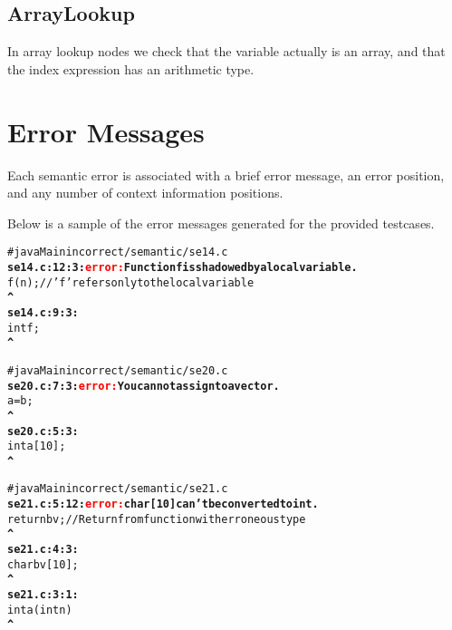 \documentclass[a4paper,11pt]{article}
\begin{document}
\subsection{ArrayLookup}
In array lookup nodes we check that the variable actually is an array, and that
the index expression has an arithmetic type.

\section{Error Messages}
Each semantic error is associated with a brief error message, an error position,
and any number of context information positions.

Below is a sample of the error messages generated for the provided testcases.

\begin{alltt}
# java Main incorrect/semantic/se14.c
\textbf{se14.c:12:3: \textcolor{red}{error:} Function f is shadowed by a local variable.}
  f(n);         // 'f' refers only to the local variable
\textbf{\color{green}  ^}
\textbf{se14.c:9:3:}
  int f;
\textbf{\color{green}  ^~~~~}
\end{alltt}

\begin{alltt}
# java Main incorrect/semantic/se20.c
\textbf{se20.c:7:3: \textcolor{red}{error:} You cannot assign to a vector.}
  a=b;
\textbf{\color{green}  ^~~}
\textbf{se20.c:5:3:}
  int a[10];
\textbf{\color{green}  ^~~~~~~~~}
\end{alltt}

\begin{alltt}
# java Main incorrect/semantic/se21.c
\textbf{se21.c:5:12: \textcolor{red}{error:} char[10] can't be converted to int.}
    return bv;  //  Return from function with erroneous type
\textbf{\color{green}           ^~~}
\textbf{se21.c:4:3:}
  char bv[10];
\textbf{\color{green}  ^~~~~~~~~~~}
\textbf{se21.c:3:1:}
int a(int n) 
\textbf{\color{green}^~~}
\end{alltt}
\end{document}
